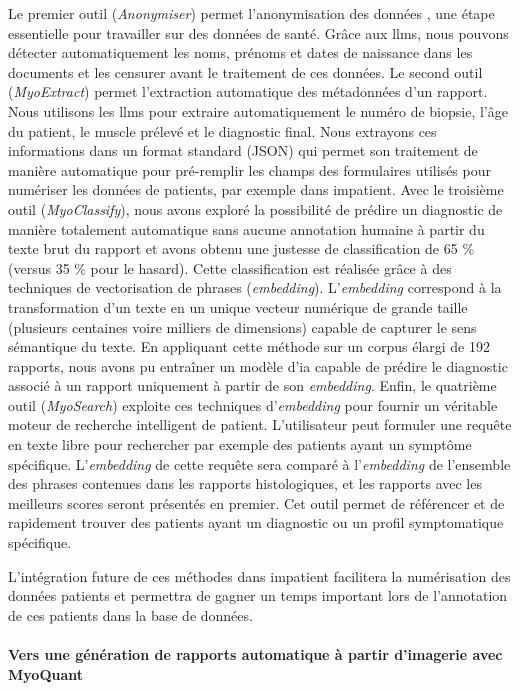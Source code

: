 Le premier outil (\textit{Anonymiser}) permet l’anonymisation des données , une étape essentielle pour travailler sur des données de santé. Grâce aux \gls{llms}, nous pouvons détecter automatiquement les noms, prénoms et dates de naissance dans les documents et les censurer avant le traitement de ces données. Le second outil (\textit{MyoExtract}) permet l’extraction automatique des métadonnées d’un rapport. Nous utilisons les \gls{llms} pour extraire automatiquement le numéro de biopsie, l’âge du patient, le muscle prélevé et le diagnostic final. Nous extrayons ces informations dans un format standard (JSON) qui permet son traitement de manière automatique pour pré-remplir les champs des formulaires utilisés pour numériser les données de patients, par exemple dans \gls{impatient}. Avec le troisième outil (\textit{MyoClassify}), nous avons exploré la possibilité de prédire un diagnostic de manière totalement automatique sans aucune annotation humaine à partir du texte brut du rapport et avons obtenu une justesse de classification de 65 \% (versus 35 \% pour le hasard). Cette classification est réalisée grâce à des techniques de vectorisation de phrases (\textit{embedding}). L’\textit{embedding} correspond à la transformation d’un texte en un unique vecteur numérique de grande taille (plusieurs centaines voire milliers de dimensions) capable de capturer le sens sémantique du texte. En appliquant cette méthode sur un corpus élargi de 192 rapports, nous avons pu entraîner un modèle d’\gls{ia} capable de prédire le diagnostic associé à un rapport uniquement à partir de son \textit{embedding}. Enfin, le quatrième outil (\textit{MyoSearch}) exploite ces techniques d’\textit{embedding} pour fournir un véritable moteur de recherche intelligent de patient. L’utilisateur peut formuler une requête en texte libre pour rechercher par exemple des patients ayant un symptôme spécifique. L’\textit{embedding} de cette requête sera comparé à l’\textit{embedding} de l’ensemble des phrases contenues dans les rapports histologiques, et les rapports avec les meilleurs scores seront présentés en premier. Cet outil permet de référencer et de rapidement trouver des patients ayant un diagnostic ou un profil symptomatique spécifique.

L’intégration future de ces méthodes dans \gls{impatient} facilitera la numérisation des données patients et permettra de gagner un temps important lors de l’annotation de ces patients dans la base de données.

\paragraph{\textbf{Vers une génération de rapports automatique à partir d’imagerie avec MyoQuant}}\mbox{}\\

